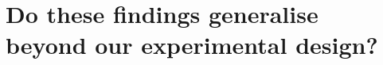\documentclass{article} %
\theoremstyle{plain}
\theoremstyle{definition}
\theoremstyle{remark}
\begin{document}







\section{Do these findings generalise beyond our experimental design?}
\end{document}
